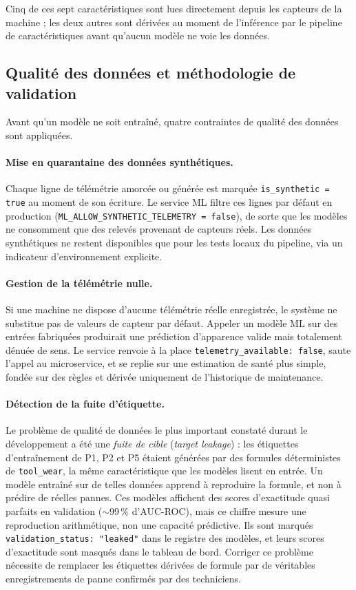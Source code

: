Cinq de ces sept caractéristiques sont lues directement depuis les capteurs de la machine ; les deux autres sont dérivées au moment de l'inférence par le pipeline de caractéristiques avant qu'aucun modèle ne voie les données.

\subsection{Qualité des données et méthodologie de validation}

Avant qu'un modèle ne soit entraîné, quatre contraintes de qualité des données sont appliquées.

\paragraph{Mise en quarantaine des données synthétiques.}
Chaque ligne de télémétrie amorcée ou générée est marquée \texttt{is\_synthetic = true} au moment de son écriture. Le service ML filtre ces lignes par défaut en production (\texttt{ML\_ALLOW\_SYNTHETIC\_TELEMETRY = false}), de sorte que les modèles ne consomment que des relevés provenant de capteurs réels. Les données synthétiques ne restent disponibles que pour les tests locaux du pipeline, via un indicateur d'environnement explicite.

\paragraph{Gestion de la télémétrie nulle.}
Si une machine ne dispose d'aucune télémétrie réelle enregistrée, le système ne substitue pas de valeurs de capteur par défaut. Appeler un modèle ML sur des entrées fabriquées produirait une prédiction d'apparence valide mais totalement dénuée de sens. Le service renvoie à la place \texttt{telemetry\_available: false}, saute l'appel au microservice, et se replie sur une estimation de santé plus simple, fondée sur des règles et dérivée uniquement de l'historique de maintenance.

\paragraph{Détection de la fuite d'étiquette.}
Le problème de qualité de données le plus important constaté durant le développement a été une \emph{fuite de cible} (\textit{target leakage}) : les étiquettes d'entraînement de P1, P2 et P5 étaient générées par des formules déterministes de \texttt{tool\_wear}, la même caractéristique que les modèles lisent en entrée. Un modèle entraîné sur de telles données apprend à reproduire la formule, et non à prédire de réelles pannes. Ces modèles affichent des scores d'exactitude quasi parfaits en validation ($\sim$99\,\% d'AUC-ROC), mais ce chiffre mesure une reproduction arithmétique, non une capacité prédictive. Ils sont marqués \texttt{validation\_status: "leaked"} dans le registre des modèles, et leurs scores d'exactitude sont masqués dans le tableau de bord. Corriger ce problème nécessite de remplacer les étiquettes dérivées de formule par de véritables enregistrements de panne confirmés par des techniciens.

